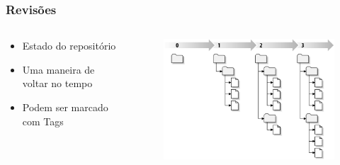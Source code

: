 \documentclass{beamer}
\begin{document}
\begin{frame}
    \frametitle{Revis\~oes}
    \begin{columns}
        \begin{column}{.5\textwidth}
            \begin{itemize}
                \item Estado do reposit\'orio
                \item Uma maneira de voltar no tempo
                \item Podem ser marcado com Tags
            \end{itemize}
        \end{column}
        \begin{column}{.5\textwidth}
            \begin{figure}
                \includegraphics[width=1.0\textwidth]{figures/revisao}
            \end{figure}
        \end{column}
    \end{columns}
\end{frame}
\end{document}
